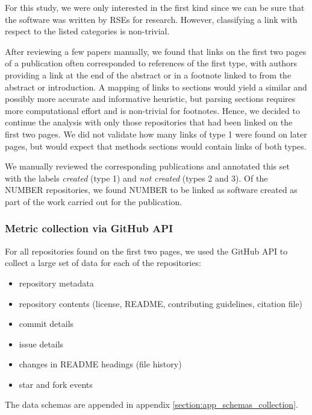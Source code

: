 \documentclass[10pt,a4paper]{scrartcl}
\begin{document}
For this study, we were only interested in the first kind since we can be sure that the software was written by RSEs for research.
However, classifying a link with respect to the listed categories is non-trivial.

After reviewing a few papers manually, we found that links on the first two pages of a publication often corresponded to references of the first type,
with authors providing a link at the end of the abstract or in a footnote linked to from the abstract or introduction.
A mapping of links to sections would yield a similar and possibly more accurate and informative heuristic,
but parsing sections requires more computational effort and is non-trivial for footnotes.
Hence, we decided to continue the analysis with only those repositories that had been linked on the first two pages.
We did not validate how many links of type 1 were found on later pages,
but would expect that methods sections would contain links of both types.

We manually reviewed the corresponding publications and annotated this set with the labels \textit{created} (type 1) and \textit{not created} (types 2 and 3).
Of the NUMBER repositories, we found NUMBER to be linked as software created as part of the work carried out for the publication.

\subsubsection*{Metric collection via GitHub API}

For all repositories found on the first two pages, we used the GitHub API to collect a large set of data for each of the repositories:

\begin{itemize}
    \item repository metadata
    \item repository contents (license, README, contributing guidelines, citation file)
    \item commit details
    \item issue details
    \item changes in README headings (file history)
    \item star and fork events
\end{itemize}

The data schemas are appended in appendix \ref{section:app_schemas_collection}.
\end{document}
